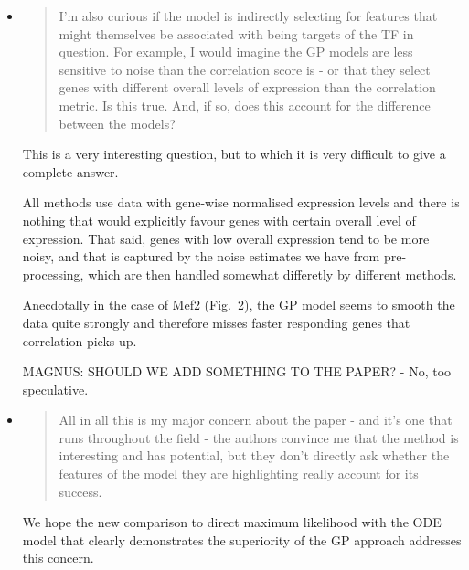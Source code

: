\documentclass{article}
\begin{document}
\begin{itemize}
\item \begin{quote} I'm also curious if the model is indirectly
    selecting for features that might themselves be associated with
    being targets of the TF in question. For example, I would imagine
    the GP models are less sensitive to noise than the correlation
    score is - or that they select genes with different overall levels
    of expression than the correlation metric. Is this true. And, if
    so, does this account for the difference between the models?
\end{quote}

This is a very interesting question, but to which it is very difficult
to give a complete answer.

All methods use data with gene-wise normalised expression levels and
there is nothing that would explicitly favour genes with certain
overall level of expression.  That said, genes with low overall
expression tend to be more noisy, and that is captured by the noise
estimates we have from pre-processing, which are then handled somewhat
differetly by different methods.

Anecdotally in the case of Mef2 (Fig.~2), the GP model seems to smooth
the data quite strongly and therefore misses faster responding genes
that correlation picks up.

MAGNUS: SHOULD WE ADD SOMETHING TO THE PAPER? - No, too speculative.

\item \begin{quote} All in all this is my major concern about the
    paper - and it's one that runs throughout the field - the authors
    convince me that the method is interesting and has potential, but
    they don't directly ask whether the features of the model they are
    highlighting really account for its success.
\end{quote}

We hope the new comparison to direct maximum likelihood with the ODE
model that clearly demonstrates the superiority of the GP approach
addresses this concern.

\end{itemize}
\end{document}
